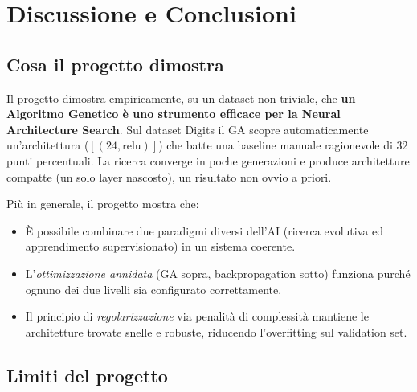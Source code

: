 \documentclass[11pt,a4paper]{article}
\begin{document}
\newpage

\section{Discussione e Conclusioni}

\subsection{Cosa il progetto dimostra}

Il progetto dimostra empiricamente, su un dataset non triviale, che
\textbf{un Algoritmo Genetico è uno strumento efficace per la Neural
Architecture Search}. Sul dataset Digits il GA scopre automaticamente
un'architettura ($[(24, \text{relu})]$) che batte una baseline manuale
ragionevole di $32$ punti percentuali. La ricerca converge in poche
generazioni e produce architetture compatte (un solo layer nascosto), un
risultato non ovvio a priori.

Più in generale, il progetto mostra che:
\begin{itemize}
    \item È possibile combinare due paradigmi diversi dell'AI (ricerca
          evolutiva ed apprendimento supervisionato) in un sistema
          coerente.
    \item L'\emph{ottimizzazione annidata} (GA sopra, backpropagation
          sotto) funziona purché ognuno dei due livelli sia configurato
          correttamente.
    \item Il principio di \emph{regolarizzazione} via penalità di
          complessità mantiene le architetture trovate snelle e
          robuste, riducendo l'overfitting sul validation set.
\end{itemize}

\subsection{Limiti del progetto}
\end{document}
